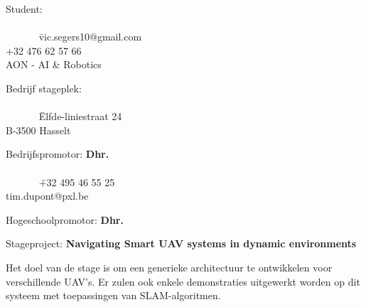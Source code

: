 \begin{tabbing}
  Student: \textbf{\student}\\
  \\
  ~~~~~~ \= vic.segers10@gmail.com\\
  \> +32 476 62 57 66\\
  \> AON - AI \& Robotics
\end{tabbing}
\begin{tabbing}
  Bedrijf stageplek: \textbf{\stagebedrijf}\\
  \\
  ~~~~~~ \= Elfde-liniestraat 24\\
  \> B-3500 Hasselt
\end{tabbing}
\begin{tabbing}
  Bedrijfspromotor: \textbf{Dhr. \bedrijfspromotor}\\
  \\
  ~~~~~~ \= +32 495 46 55 25\\
  \> tim.dupont@pxl.be
\end{tabbing}
\begin{tabbing}
  Hogeschoolpromotor: \textbf{Dhr. \hogeschoolpromotor}
\end{tabbing}
Stageproject: \textbf{Navigating Smart UAV systems in dynamic environments}
\begin{addmargin}[5ex]{0pt}
  Het doel van de stage is om een generieke architectuur te ontwikkelen voor verschillende UAV's.
  Er zulen ook enkele demonstraties uitgewerkt worden op dit systeem met toepassingen van SLAM-algoritmen.
\end{addmargin}